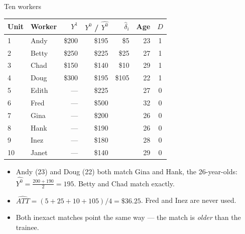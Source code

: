 \documentclass[
  11pt,
  ignorenonframetext,
  aspectratio=169,
]{beamer}
\providecommand{\tightlist}{%
  \setlength{\itemsep}{0pt}\setlength{\parskip}{0pt}}
\begin{document}
\begin{frame}{Ten workers}
\protect{}\label{ten-workers}
\small
\begin{center}
\begin{tabular}{llrrrrc}
\toprule
Unit & Worker & $Y^1$ & $Y^0$ / $\widehat{Y^0}$ & $\hat\delta_i$ & Age & $D$ \\
\midrule
1 & Andy  & \$200 & \$195 & \$5   & 23 & 1 \\
2 & Betty & \$250 & \$225 & \$25  & 27 & 1 \\
3 & Chad  & \$150 & \$140 & \$10  & 29 & 1 \\
4 & Doug  & \$300 & \$195 & \$105 & 22 & 1 \\
\midrule
5 & Edith & --- & \$225 & & 27 & 0 \\
6 & Fred  & --- & \$500 & & 32 & 0 \\
7 & Gina  & --- & \$200 & & 26 & 0 \\
8 & Hank  & --- & \$190 & & 26 & 0 \\
9 & Inez  & --- & \$180 & & 28 & 0 \\
10 & Janet & --- & \$140 & & 29 & 0 \\
\bottomrule
\end{tabular}
\end{center}
\normalsize

\begin{itemize}
\tightlist
\item
  Andy (23) and Doug (22) both match Gina and Hank, the 26-year-olds:
  \(\widehat{Y^0} = \tfrac{200+190}{2} = 195\). Betty and Chad match
  exactly.
\item
  \(\widehat{ATT} = (5 + 25 + 10 + 105)/4 = \$36.25\). Fred and Inez are
  never used.
\item
  Both inexact matches point the same way --- the match is \emph{older}
  than the trainee.
\end{itemize}
\end{frame}
\end{document}
